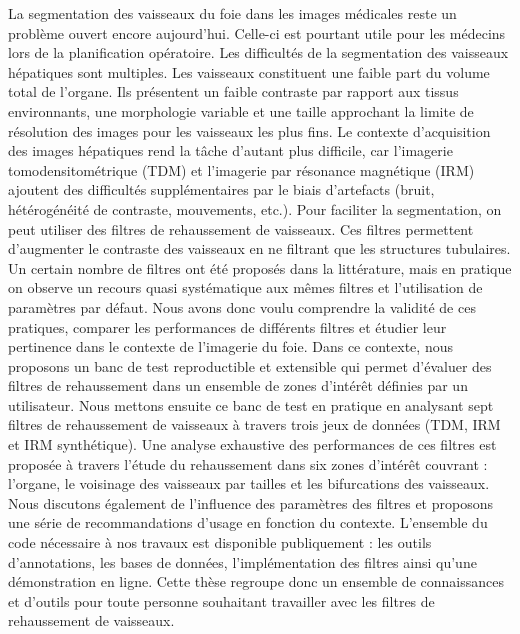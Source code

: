 %
\label{sec:abstract}
La segmentation des vaisseaux du foie dans les images médicales reste un problème ouvert encore aujourd'hui. Celle-ci est pourtant utile pour les médecins lors de la planification opératoire. Les difficultés de la segmentation des vaisseaux hépatiques sont multiples. Les vaisseaux constituent une faible part du volume total de l'organe. Ils présentent un faible contraste par rapport aux tissus environnants, une morphologie variable et une taille approchant la limite de résolution des images pour les vaisseaux les plus fins. Le contexte d'acquisition des images hépatiques rend la tâche d'autant plus difficile, car l'imagerie tomodensitométrique (TDM) et l'imagerie par résonance magnétique (IRM) ajoutent des difficultés supplémentaires par le biais d'artefacts (bruit, hétérogénéité de contraste, mouvements, etc.). Pour faciliter la segmentation, on peut utiliser des filtres de rehaussement de vaisseaux. Ces filtres permettent d'augmenter le contraste des vaisseaux en ne filtrant que les structures tubulaires. Un certain nombre de filtres ont été proposés dans la littérature, mais en pratique on observe un recours quasi systématique aux mêmes filtres et l'utilisation de paramètres par défaut. Nous avons donc voulu comprendre la validité de ces pratiques, comparer les performances de différents filtres et étudier leur pertinence dans le contexte de l'imagerie du foie. Dans ce contexte, nous proposons un banc de test reproductible et extensible qui permet d'évaluer des filtres de rehaussement dans un ensemble de zones d'intérêt définies par un utilisateur. Nous mettons ensuite ce banc de test en pratique en analysant sept filtres de rehaussement de vaisseaux à travers trois jeux de données (TDM, IRM et IRM synthétique). Une analyse exhaustive des performances de ces filtres est proposée à travers l'étude du rehaussement dans six zones d'intérêt couvrant : l'organe, le voisinage des vaisseaux par tailles et les bifurcations des vaisseaux. Nous discutons également de l'influence des paramètres des filtres et proposons une série de recommandations d'usage en fonction du contexte. L'ensemble du code nécessaire à nos travaux est disponible publiquement : les outils d'annotations, les bases de données, l'implémentation des filtres ainsi qu'une démonstration en ligne. Cette thèse regroupe donc un ensemble de connaissances et d'outils pour toute personne souhaitant travailler avec les filtres de rehaussement de vaisseaux.

